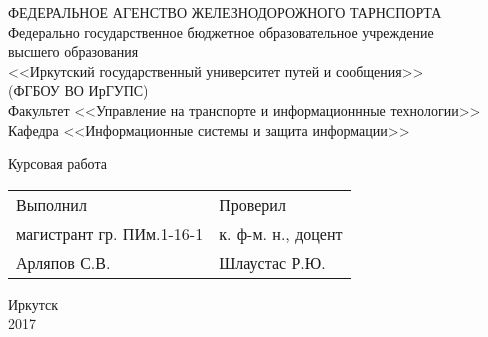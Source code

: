 \begin{titlepage}
	\newpage
	\begin{center}
		ФЕДЕРАЛЬНОЕ АГЕНСТВО ЖЕЛЕЗНОДОРОЖНОГО ТАРНСПОРТА \\
		\vspace{14pt}
		Федерально государственное бюджетное образовательное учреждение \\ высшего образования \\
		<<Иркутский государственный университет путей и сообщения>> \\
		(ФГБОУ ВО ИрГУПС) \\
		\vspace{28pt}
		Факультет <<Управление на транспорте и информационнные технологии>> \\
		Кафедра <<Информационные системы и защита информации>>
	\end{center}
	\vspace{28pt}
	\begin{center}
		\MakeUppercase{\kurtitle}
	\end{center}
	\vspace{-14pt}
	\begin{center}
		Курсовая работа \\
	\vspace{14pt}
		\mytitle
	\end{center}
	\vspace{56pt}
	\begin{flushleft}
		\begin{tabular}{p{}l}
			Выполнил					&  Проверил 			\\
			магистрант гр. ПИм.1-16-1	&  к. ф-м. н., доцент	\\
			Арляпов С.В.				&  Шлаустас Р.Ю.		\\
		\end{tabular}
	\end{flushleft}
	\vspace{\fill}
	\begin{center}
		Иркутск \\ 2017
	\end{center}
\end{titlepage}

\setcounter{page}{2}
\renewcommand{\thispagestyle}[1]{}
\tableofcontents
\thispagestyle{empty}
